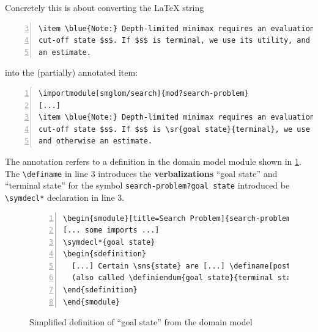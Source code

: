 \documentclass{llncs}
\def\llangle{\langle\kern-.2em\langle}
\def\rrangle{\rangle\kern-.2em\rangle}
\begin{document}
Concretely this is about converting the {\LaTeX} string
\begin{lstlisting}[numbers=left,firstnumber=3,
caption=The {\LaTeX} sources of \cref{fig:lo},label=lst:los]
\item \blue{Note:} Depth-limited minimax requires an evaluation for every
cut-off state $s$. If $s$ is terminal, we use its utility, and otherwise
an estimate.
\end{lstlisting}
into the (partially) annotated item:
\begin{lstlisting}[morekeywords={sr,importmodule},numbers=left,
caption=Annotating ``terminal'' in \cref{lst:los},label=lst:losa]
\importmodule[smglom/search]{mod?search-problem}
[...]
\item \blue{Note:} Depth-limited minimax requires an evaluation for every
cut-off state $s$. If $s$ is \sr{goal state}{terminal}, we use its utility,
and otherwise an estimate.
\end{lstlisting}

The annotation rerfers to a definition in the domain model module shown in
\cref{fig:state-space}. The \lstinline|\definame| in line 3 introduces the
\textbf{verbalizations} ``goal state'' and ``terminal state'' for the symbol
\lstinline|search-problem?goal state| introduced be \lstinline|\symdecl*| declaration in
line 3.

\begin{figure}[ht]\centering
\begin{lstlisting}[morekeywords={definame,symdecl},numbers=left]
\begin{smodule}[title=Search Problem]{search-problem}
[... some imports ...]
\symdecl*{goal state}
\begin{sdefinition}
  [...] Certain \sns{state} are [...] \definame[post=s]{goal state} [...]
  (also called \definiendum{goal state}{terminal states}).
\end{sdefinition}
\end{smodule}
\end{lstlisting}
  \caption{Simplified definition of ``goal state'' from the domain model}\label{fig:state-space}
\end{figure}
\end{document}
